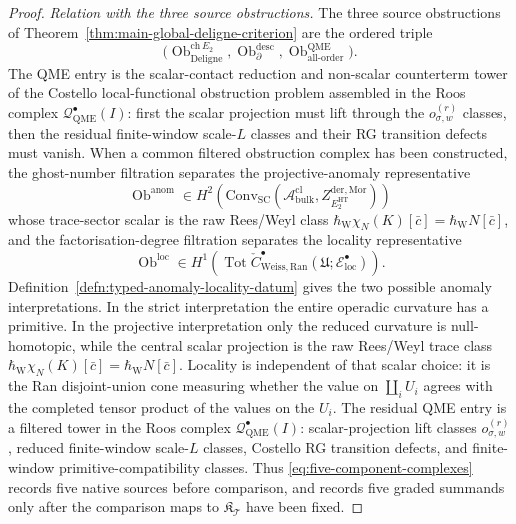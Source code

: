 \begin{proof}
\emph{Relation with the three source obstructions.}  The three source
obstructions of Theorem~\ref{thm:main-global-deligne-criterion} are the
ordered triple
\[
 \bigl(
 \operatorname{Ob}^{\mathrm{ch}\,E_2}_{\mathrm{Deligne}},
 \operatorname{Ob}^{\mathrm{desc}}_{\partial},
 \operatorname{Ob}^{\mathrm{QME}}_{\mathrm{all\mbox{-}order}}
 \bigr).
\]
The QME entry is the scalar-contact reduction and non-scalar
counterterm tower of the Costello local-functional obstruction problem
assembled in the Roos complex
\(\mathcal Q^\bullet_{\mathrm{QME}}(I)\): first the scalar projection
must lift through the \(o_{\sigma,w}^{(r)}\) classes, then the residual
finite-window scale-\(L\) classes and their RG transition defects must
vanish.  When a common
filtered obstruction complex has been constructed, the ghost-number
filtration separates the projective-anomaly representative
\[
  \operatorname{Ob}^{\mathrm{anom}}\in
  H^2(\mathrm{Conv}_{\mathrm{SC}}(
  \mathcal A^{\mathrm{cl}}_{\mathrm{bulk}},
  Z^{\mathrm{der},\mathrm{Mor}}_{E_2^{\mathrm{HT}}}))
\]
whose trace-sector scalar is the raw Rees/Weyl class
\(\hbar_{\mathrm{W}}\chi_N(K)[\bar c]
=\hbar_{\mathrm{W}}N[\bar c]\), and
the factorisation-degree filtration separates the locality representative
\[
  \operatorname{Ob}^{\mathrm{loc}}\in
  H^1\!\left(
  \operatorname{Tot}\check C^\bullet_{\mathrm{Weiss,Ran}}
  (\mathfrak U;\mathcal E^\bullet_{\mathrm{loc}})\right).
\]
Definition~\ref{defn:typed-anomaly-locality-datum} gives the two
possible anomaly interpretations.  In the strict interpretation the
entire operadic curvature has a primitive.  In the projective
interpretation only the reduced curvature is null-homotopic, while the
central scalar projection is the raw Rees/Weyl trace class
\(\hbar_{\mathrm{W}}\chi_N(K)[\bar c]
=\hbar_{\mathrm{W}}N[\bar c]\).  Locality is independent of that scalar
choice: it is the Ran disjoint-union cone measuring whether the value on
\(\coprod_i U_i\) agrees with the completed tensor product of the values
on the \(U_i\).
The residual QME entry is a filtered tower in the Roos complex
\(\mathcal Q^\bullet_{\mathrm{QME}}(I)\): scalar-projection lift
classes \(o_{\sigma,w}^{(r)}\), reduced finite-window scale-\(L\)
classes, Costello RG transition defects, and finite-window
primitive-compatibility classes.  Thus
\eqref{eq:five-component-complexes} records five native sources before
comparison, and records five graded summands only after the comparison
maps to \(\mathfrak K_{\mathcal T}\) have been fixed.


\end{proof}
